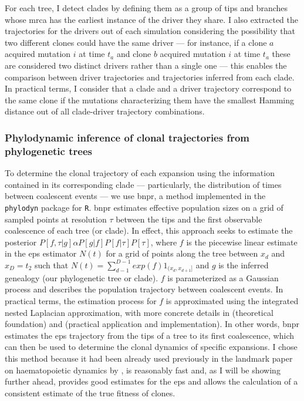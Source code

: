 For each tree, I detect clades by defining them as a group of tips and branches whose \ac{mrca} has the earliest instance of the driver they share. I also extracted the trajectories for the drivers out of each simulation considering the possibility that two different clones could have the same driver --- for instance, if a clone $a$ acquired mutation $i$ at time $t_a$ and clone $b$ acquired mutation $i$ at time $t_a$ these are considered two distinct drivers rather than a single one --- this enables the comparison between driver trajectories and trajectories inferred from each clade. In practical terms, I consider that a clade and a driver trajectory correspond to the same clone if the mutations characterizing them have the smallest Hamming distance out of all clade-driver trajectory combinations. 

\subsubsection{Phylodynamic inference of clonal trajectories from phylogenetic trees}

To determine the clonal trajectory of each expansion using the information contained in its corresponding clade --- particularly, the distribution of times between coalescent events --- we use \ac{bnpr}, a method implemented in the \texttt{phylodyn} \cite{Lan2015-sw,Karcher2017-kt} package for \texttt{R}. \ac{bnpr} estimates effective population sizes on a grid of sampled points at resolution $\tau$ between the tips and the first observable coalescence of each tree (or clade). In effect, this approach seeks to estimate the posterior $P[f,\tau|g]\alpha P[g|f]P[f|\tau]P[\tau]$, where $f$ is the piecewise linear estimate in the \ac{eps} estimator $N(t)$ for a grid of points along the tree between $x_d$ and $x_D=t_2$ such that $N(t) = \sum^{D-1}_{d-1}exp(f)1_{(x_d,x_{d+1}]}$ and $g$ is the inferred genealogy (our phylogenetic tree or clade). $f$ is parameterized as a Gaussian process and describes the population trajectory between coalescent events. In practical terms, the estimation process for $f$ is approximated using the integrated nested Laplacian approximation, with more concrete details in \cite{Lan2015-sw} (theoretical foundation) and \cite{Karcher2017-kt} (practical application and implementation). In other words, \ac{bnpr} estimates the \ac{eps} trajectory from the tips of a tree to its first coalescence, which can then be used to determine the clonal dynamics of specific expansions. I chose this method because it had been already used previously in the landmark paper on haematopoietic dynamics by , is reasonably fast and, as I will be showing further ahead, provides good estimates for the \ac{eps} and allows the calculation of a consistent estimate of the true fitness of clones.

